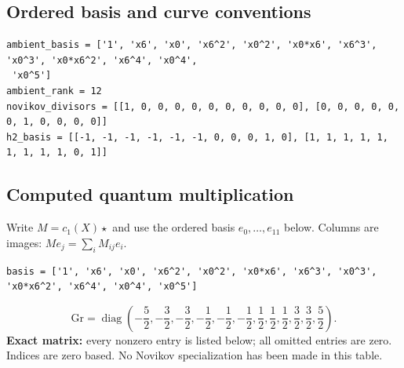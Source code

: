 \documentclass[10pt,a4paper]{article}
\begin{document}
\subsection*{Ordered basis and curve conventions}
\begin{lstlisting}
ambient_basis = ['1', 'x6', 'x0', 'x6^2', 'x0^2', 'x0*x6', 'x6^3', 'x0^3', 'x0*x6^2', 'x6^4', 'x0^4',
 'x0^5']
ambient_rank = 12
novikov_divisors = [[1, 0, 0, 0, 0, 0, 0, 0, 0, 0, 0], [0, 0, 0, 0, 0, 0, 1, 0, 0, 0, 0]]
h2_basis = [[-1, -1, -1, -1, -1, -1, 0, 0, 0, 1, 0], [1, 1, 1, 1, 1, 1, 1, 1, 1, 0, 1]]
\end{lstlisting}
\subsection*{Computed quantum multiplication}
Write $M=c_1(X)\star$ and use the ordered basis $e_0,\ldots,e_{11}$ below. Columns are images: $M e_j=\sum_i M_{ij}e_i$.
\begin{lstlisting}
basis = ['1', 'x6', 'x0', 'x6^2', 'x0^2', 'x0*x6', 'x6^3', 'x0^3', 'x0*x6^2', 'x6^4', 'x0^4', 'x0^5']
\end{lstlisting}
\[\mathrm{Gr}=\operatorname{diag}\!\left(- \frac{5}{2},- \frac{3}{2},- \frac{3}{2},- \frac{1}{2},- \frac{1}{2},- \frac{1}{2},\frac{1}{2},\frac{1}{2},\frac{1}{2},\frac{3}{2},\frac{3}{2},\frac{5}{2}\right).\]
\textbf{Exact matrix:} every nonzero entry is listed below; all omitted entries are zero. Indices are zero based. No Novikov specialization has been made in this table.
\end{document}
